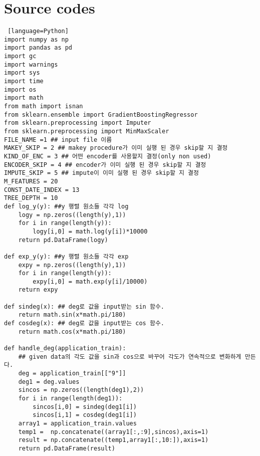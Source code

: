 \documentclass{article}
\begin{document}
\section{Source codes}
\begin{lstlisting} [language=Python]
import numpy as np
import pandas as pd
import gc
import warnings
import sys
import time
import os
import math
from math import isnan
from sklearn.ensemble import GradientBoostingRegressor
from sklearn.preprocessing import Imputer
from sklearn.preprocessing import MinMaxScaler
FILE_NAME =1 ## input file 이름
MAKEY_SKIP = 2 ## makey procedure가 이미 실행 된 경우 skip할 지 결정
KIND_OF_ENC = 3 ## 어떤 encoder를 사용할지 결정(only non used)
ENCODER_SKIP = 4 ## encoder가 이미 실행 된 경우 skip할 지 결정
IMPUTE_SKIP = 5 ## impute이 이미 실행 된 경우 skip할 지 결정
M_FEATURES = 20
CONST_DATE_INDEX = 13
TREE_DEPTH = 10
def log_y(y): ##y 행렬 원소들 각각 log
    logy = np.zeros((length(y),1))
    for i in range(length(y)):
        logy[i,0] = math.log(y[i])*10000
    return pd.DataFrame(logy)

def exp_y(y): ##y 행렬 원소들 각각 exp 
    expy = np.zeros((length(y),1))
    for i in range(length(y)):
        expy[i,0] = math.exp(y[i]/10000)
    return expy

def sindeg(x): ## deg로 값을 input받는 sin 함수.
    return math.sin(x*math.pi/180)
def cosdeg(x): ## deg로 값을 input받는 cos 함수.
    return math.cos(x*math.pi/180)

def handle_deg(application_train):
    ## given data의 각도 값을 sin과 cos으로 바꾸어 각도가 연속적으로 변화하게 만든다.
    deg = application_train[["9"]]
    deg1 = deg.values
    sincos = np.zeros((length(deg1),2))
    for i in range(length(deg1)):
        sincos[i,0] = sindeg(deg1[i])
        sincos[i,1] = cosdeg(deg1[i])
    array1 = application_train.values
    temp1 =  np.concatenate((array1[:,:9],sincos),axis=1)
    result = np.concatenate((temp1,array1[:,10:]),axis=1)
    return pd.DataFrame(result)


\end{lstlisting}
\end{document}
